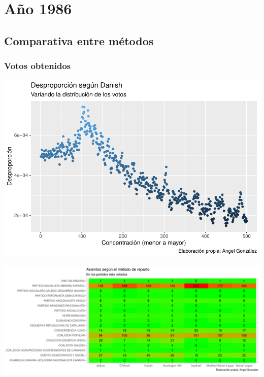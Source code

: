 \documentclass[12pt,a4paper,]{book}
\numberwithin{dummy}{section}
\theoremstyle{ocrenumbox}
\theoremstyle{blacknumex}
\theoremstyle{blacknumbox}
\theoremstyle{ocrenum}
\theoremstyle{ocrenum}
\begin{document}
\hypertarget{auxf1o-1986}{%
\section{Año 1986}\label{auxf1o-1986}}

\hypertarget{comparativa-entre-muxe9todos-3}{%
\subsection{Comparativa entre
métodos}\label{comparativa-entre-muxe9todos-3}}

\hypertarget{votos-obtenidos-3}{%
\subsubsection{Votos obtenidos}\label{votos-obtenidos-3}}

\begin{center}\includegraphics[width=0.95\linewidth]{figurasR/unnamed-chunk-38-1} \end{center}

\begin{center}\includegraphics[width=0.95\linewidth]{figurasR/unnamed-chunk-38-2} \end{center}
\end{document}

